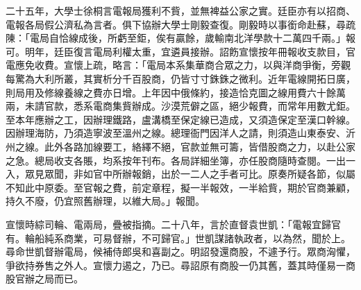 \begin{pinyinscope}
二十五年，大學士徐桐言電報局獲利不貲，並無裨益公家之實。廷臣亦有以招商、電報各局假公濟私為言者。俱下協辦大學士剛毅查復。剛毅時以事銜命赴蘇，尋疏陳：「電局自恰線成後，所虧至鉅，俟有贏餘，歲輸南北洋學款十二萬四千兩。」報可。明年，廷臣復言電局利權太重，宜遴員接辦。詔飭宣懷按年冊報收支款目，官電應免收費。宣懷上疏，略言：「電局本系集華商合眾之力，以與洋商爭衡，旁觀每驚為大利所叢，其實析分千百股商，仍皆寸寸銖銖之微利。近年電線開拓日廣，則局用及修線養線之費亦日增。上年因中俄條約，接造恰克圖之線用費六十餘萬兩，未請官款，悉系電商集貲辦成。沙漠荒僻之區，絕少報費，而常年用數尤鉅。至本年應辦之工，因辦理鐵路，盧溝橋至保定線已造成，又須造保定至漢口幹線。因辦理海防，乃須造寧波至溫州之線。總理衙門因洋人之請，則須造山東泰安、沂州之線。此外各路加線要工，絡繹不絕，官款並無可籌，皆借股商之力，以赴公家之急。總局收支各賬，均系按年刊布。各局詳細坐簿，亦任股商隨時查閱。一出一入，眾見眾聞，非如官中所辦報銷，出於一二人之手者可比。原奏所疑各節，似屬不知此中原委。至官報之費，前定章程，擬一半報效，一半給貲，期於官商兼顧，持久不廢，仍宜照舊辦理，以維大局。」報聞。

宣懷時綜司輪、電兩局，疊被指摘。二十八年，言於直督袁世凱：「電報宜歸官有。輪船純系商業，可易督辦，不可歸官。」世凱謀諸執政者，以為然，聞於上。尋命世凱督辦電局，候補侍郎吳和喜副之。明詔發還商股，不遽予行。眾商洶懼，爭欲持券售之外人。宣懷力遏之，乃已。尋詔原有商股一仍其舊，蓋其時僅易一商股官辦之局而已。


\end{pinyinscope}
